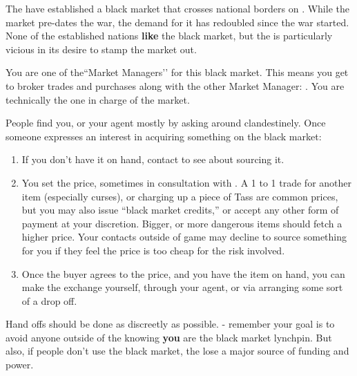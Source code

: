 \documentclass[green]{GL2020}
\begin{document}
\name{\gBMRun{}}

The \pGoaties{} have established a black market that crosses national borders on \pEarth{}. While the market pre-dates the war, the demand for it has redoubled since the war started. None of the established nations \textbf{like} the black market, but the \pTech{} is particularly vicious in its desire to stamp the market out.

You are one of the``Market Managers’’ for this black market. This means you get to broker trades and purchases along with the other Market Manager: \cChupInventor{\full}. You are technically the one in charge of the market.

People find you, or your agent \cLibAssist{\full} mostly by asking around clandestinely. Once someone expresses an interest in acquiring something on the black market:

\begin{enumerate}
  \item If you don’t have it on hand, contact \cChupInventor{} to see about sourcing it.
  \item You set the price, sometimes in consultation with \cChupInventor{}. A 1 to 1 trade for another item (especially curses), or charging up a piece of Tass are common prices, but you may also issue “black market credits,” or accept any other form of payment at your discretion. Bigger, or more dangerous items should fetch a higher price. Your contacts outside of game may decline to source something for you if they feel the price is too cheap for the risk involved.
  \item Once the buyer agrees to the price, and you have the item on hand, you can make the exchange yourself, through your agent, or via arranging some sort of a drop off.
\end{enumerate}

Hand offs should be done as discreetly as possible. - remember your goal is to avoid anyone outside of the \pGoaties{} knowing \textbf{you} are the black market lynchpin. But also, if people don’t use the black market, the \pGoaties{} lose a major source of funding and power.  
\end{document}
